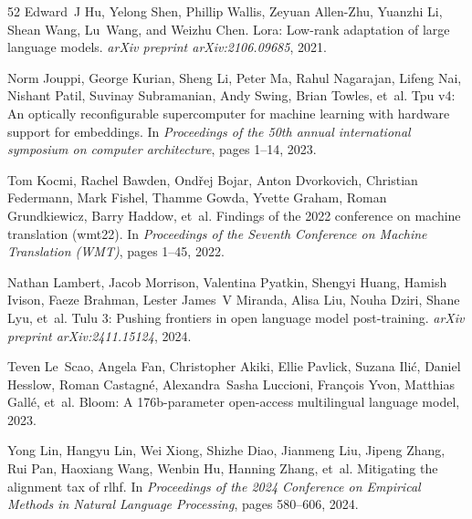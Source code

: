 \begin{thebibliography}{52}
Edward~J Hu, Yelong Shen, Phillip Wallis, Zeyuan Allen-Zhu, Yuanzhi Li, Shean Wang, Lu~Wang, and Weizhu Chen.
\newblock Lora: Low-rank adaptation of large language models.
\newblock \emph{arXiv preprint arXiv:2106.09685}, 2021.

Norm Jouppi, George Kurian, Sheng Li, Peter Ma, Rahul Nagarajan, Lifeng Nai, Nishant Patil, Suvinay Subramanian, Andy Swing, Brian Towles, et~al.
\newblock Tpu v4: An optically reconfigurable supercomputer for machine learning with hardware support for embeddings.
\newblock In \emph{Proceedings of the 50th annual international symposium on computer architecture}, pages 1--14, 2023.

Tom Kocmi, Rachel Bawden, Ond{\v{r}}ej Bojar, Anton Dvorkovich, Christian Federmann, Mark Fishel, Thamme Gowda, Yvette Graham, Roman Grundkiewicz, Barry Haddow, et~al.
\newblock Findings of the 2022 conference on machine translation (wmt22).
\newblock In \emph{Proceedings of the Seventh Conference on Machine Translation (WMT)}, pages 1--45, 2022.

Nathan Lambert, Jacob Morrison, Valentina Pyatkin, Shengyi Huang, Hamish Ivison, Faeze Brahman, Lester James~V Miranda, Alisa Liu, Nouha Dziri, Shane Lyu, et~al.
\newblock Tulu 3: Pushing frontiers in open language model post-training.
\newblock \emph{arXiv preprint arXiv:2411.15124}, 2024.

Teven Le~Scao, Angela Fan, Christopher Akiki, Ellie Pavlick, Suzana Ili{\'c}, Daniel Hesslow, Roman Castagn{\'e}, Alexandra~Sasha Luccioni, Fran{\c{c}}ois Yvon, Matthias Gall{\'e}, et~al.
\newblock Bloom: A 176b-parameter open-access multilingual language model, 2023.

Yong Lin, Hangyu Lin, Wei Xiong, Shizhe Diao, Jianmeng Liu, Jipeng Zhang, Rui Pan, Haoxiang Wang, Wenbin Hu, Hanning Zhang, et~al.
\newblock Mitigating the alignment tax of rlhf.
\newblock In \emph{Proceedings of the 2024 Conference on Empirical Methods in Natural Language Processing}, pages 580--606, 2024.


\end{thebibliography}
